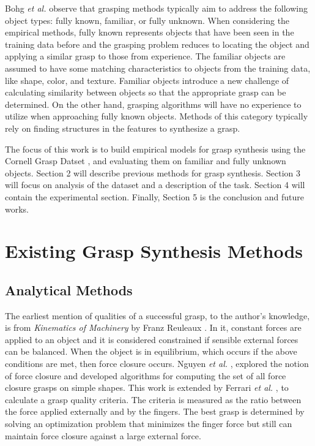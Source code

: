 \documentclass{article}
\begin{document}
Bohg \textit{et al.} \cite{bohg14} observe that grasping methods typically aim
to address the following object types: fully known, familiar, or fully unknown.
When considering the empirical methods, fully known represents objects that
have been seen in the training data before and the grasping problem reduces to
locating the object and applying a similar grasp to those from experience.
The familiar objects are assumed to have some matching characteristics to objects
from the training data, like shape, color, and texture. Familiar objects
introduce a new challenge of calculating similarity between objects so that
the appropriate grasp can be determined. On the other hand, grasping algorithms
will have no experience to utilize when approaching fully known objects. Methods
of this category typically rely on finding structures in the features to
synthesize a grasp.

The focus of this work is to build empirical models for grasp synthesis using
the Cornell Grasp Datset \cite{lenz15}, and evaluating them on familiar and
fully unknown objects. Section 2 will describe previous methods for grasp
synthesis. Section 3 will focus on analysis of the dataset and a description
of the task. Section 4 will contain the experimental section. Finally, Section
5 is the conclusion and future works.

\section{Existing Grasp Synthesis Methods}
\subsection{Analytical Methods}
The earliest mention of qualities of a successful grasp, to the author's
knowledge, is from \textit{Kinematics of Machinery} by Franz Reuleaux
\cite{reuleaux74}.
In it, constant forces are applied to an object and it is considered
constrained if sensible external forces can be balanced. When the
object is in equilibrium, which occurs if the above conditions are
met, then force closure occurs. Nguyen \textit{et al.} \cite{nguyen86},
explored the notion of force closure and developed algorithms for computing
the set of all force closure grasps on simple shapes.
This work is extended by Ferrari \textit{et al.} \cite{ferrari92}, to calculate
a grasp quality criteria. The criteria is measured as the ratio between the force
applied externally and by the fingers. The best grasp is determined by solving
an optimization problem that minimizes the finger force but still can maintain
force closure against a large external force.
\end{document}
